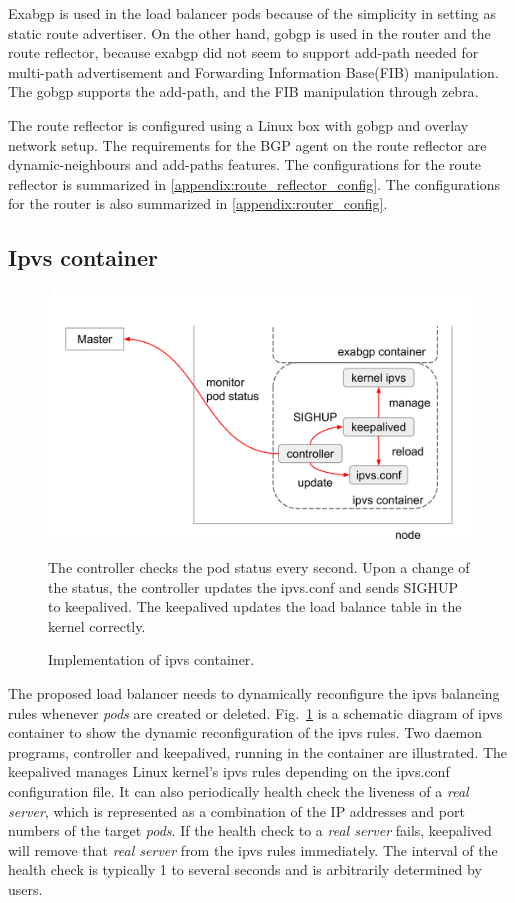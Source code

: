 Exabgp is used in the load balancer pods because of the simplicity in setting as static route advertiser.
On the other hand, gobgp is used in the router and the route reflector, because exabgp did not seem to support add-path\cite{rfc7911} needed for multi-path advertisement and Forwarding Information Base(FIB) manipulation\cite{exa-networks_2018}.
The gobgp supports the add-path, and the FIB manipulation through zebra\cite{osrg_gobgp_zebra}.

The route reflector is configured using a Linux box with gobgp and overlay network setup.
The requirements for the BGP agent on the route reflector are dynamic-neighbours and add-paths features.
The configurations for the route reflector is summarized in \ref{appendix:route_reflector_config}.
The configurations for the router is also summarized in \ref{appendix:router_config}.

\subsection{Ipvs container}

\begin{figure}[tb]
\includegraphics[width=\columnwidth]{Figs/ipvs-ingress-schem}
\caption{Implementation of ipvs container.}
The controller checks the pod status every second.
Upon a change of the status, the controller updates the ipvs.conf and sends SIGHUP to keepalived.
The keepalived updates the load balance table in the kernel correctly.
\label{fig:ipvs-ingress-schem}
\end{figure} 

The proposed load balancer needs to dynamically reconfigure the ipvs balancing rules whenever {\em pods} are created or deleted. 
Fig.~\ref{fig:ipvs-ingress-schem} is a schematic diagram of ipvs container to show the dynamic reconfiguration of the ipvs rules.
Two daemon programs, controller and keepalived, running in the container are illustrated.
The keepalived manages Linux kernel's ipvs rules depending on the ipvs.conf configuration file.
It can also periodically health check the liveness of a {\em real server}, 
which is represented as a combination of the IP addresses and port numbers of the target {\em pods}. 
If the health check to a {\em real server} fails, keepalived will remove that {\em real server} from the ipvs rules immediately.
The interval of the health check is typically 1 to several seconds and is arbitrarily determined by users.  

